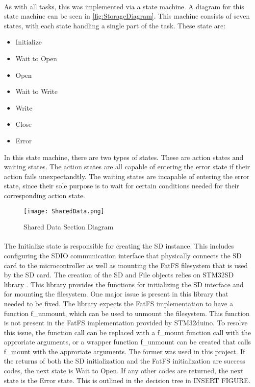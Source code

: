 \paragraph{}
As with all tasks, this was implemented via a state machine.
A diagram for this state machine can be seen in \cref{fig:StorageDiagram}.
This machine consists of seven states, with each state handling a single part of the task.
These state are:
\begin{itemize}
	\item Initialize
	\item Wait to Open
	\item Open
	\item Wait to Write
	\item Write
	\item Close
	\item Error
\end{itemize}
In this state machine, there are two types of states.
These are action states and waiting states.
The action states are all capable of entering the error state if their action fails unexpectandtly.
The waiting states are incapable of entering the error state, since their sole purpose is to wait for certain conditions needed for their corresponding action state.

\begin{figure}[H]
	\centering
	\texttt{[image: SharedData.png]}
	\caption{Shared Data Section Diagram}
	\label{fig:SharedData}
\end{figure}

\paragraph{}
The Initialize state is responsible for creating the SD instance.
This includes configuring the SDIO communication interface that physically connects the SD card to the microcontroller as well as mounting the FatFS filesystem that is used by the SD card.
The creation of the SD and File objects relies on STM32SD library \cite{STM32SDGithub}.
This library provides the functions for initializing the SD interface and for mounting the filesystem.
One major issue is present in this library that needed to be fixed.
The library expects the FatFS implementation to have a function f\_unmount, which can be used to unmount the filesystem.
This function is not present in the FatFS implementation provided by STM32duino.
To resolve this issue, the function call can be replaced with a f\_mount function call with the approriate arguments, or a wrapper function f\_unmount can be created that calls f\_mount with the approriate arguments.
The former was used in this project.
If the returns of both the SD initialization and the FatFS initialization are success codes, the next state is Wait to Open.
If any other codes are returned, the next state is the Error state.
This is outlined in the decision tree in INSERT FIGURE.

